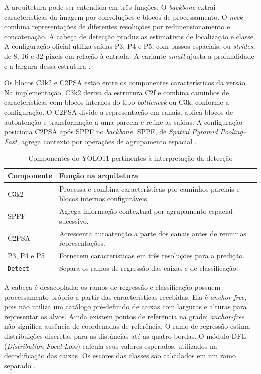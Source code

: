 A arquitetura pode ser entendida em três funções. O \textit{backbone} extrai características da imagem por convoluções e blocos de processamento. O \textit{neck} combina representações de diferentes resoluções por redimensionamento e concatenação. A cabeça de detecção produz as estimativas de localização e classe. A configuração oficial utiliza saídas P3, P4 e P5, com passos espaciais, ou \textit{strides}, de 8, 16 e 32 pixels em relação à entrada. A variante \textit{small} ajusta a profundidade e a largura dessa estrutura \cite{ultralytics2024yaml}.

Os blocos C3k2 e C2PSA estão entre os componentes característicos da versão. Na implementação, C3k2 deriva da estrutura C2f e combina caminhos de características com blocos internos do tipo \textit{bottleneck} ou C3k, conforme a configuração. O C2PSA divide a representação em canais, aplica blocos de autoatenção e transformação a uma parcela e reúne as saídas. A configuração posiciona C2PSA após SPPF no \textit{backbone}. SPPF, de \textit{Spatial Pyramid Pooling--Fast}, agrega contexto por operações de agrupamento espacial \cite{ultralytics2024blocks,ultralytics2024yaml}.

\begin{table}[htb]
\caption{Componentes do YOLO11 pertinentes à interpretação da detecção}
\label{tab:yolo11-componentes}\centering\small
\begin{tabularx}{\textwidth}{p{}X}
\toprule Componente & Função na arquitetura\\\midrule
C3k2 & Processa e combina características por caminhos parciais e blocos internos configuráveis.\\
SPPF & Agrega informação contextual por agrupamento espacial sucessivo.\\
C2PSA & Acrescenta autoatenção a parte dos canais antes de reunir as representações.\\
P3, P4 e P5 & Fornecem características em três resoluções para a predição.\\
\texttt{Detect} & Separa os ramos de regressão das caixas e de classificação.\\\bottomrule
\end{tabularx}
\end{table}

A cabeça é desacoplada: os ramos de regressão e classificação possuem processamento próprio a partir das características recebidas. Ela é \textit{anchor-free}, pois não utiliza um catálogo pré-definido de caixas com larguras e alturas para representar os alvos. Ainda existem pontos de referência na grade; \textit{anchor-free} não significa ausência de coordenadas de referência. O ramo de regressão estima distribuições discretas para as distâncias até as quatro bordas. O módulo DFL (\textit{Distribution Focal Loss}) calcula seus valores esperados, utilizados na decodificação das caixas. Os escores das classes são calculados em um ramo separado \cite{ultralytics2024head}.

